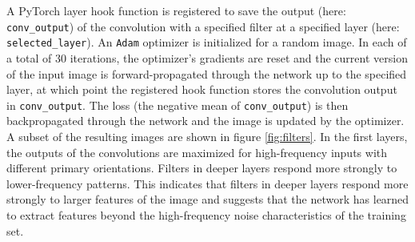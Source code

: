 \documentclass[a4paper]{article}
\begin{document}
A PyTorch layer hook function is registered to save the output (here: \texttt{conv\_output}) of the convolution with a specified filter at a specified layer (here: \texttt{selected\_layer}). An \texttt{Adam} optimizer \cite{Kingma2014} is initialized for a random image. In each of a total of 30 iterations, the optimizer's gradients are reset and the current version of the input image is forward-propagated through the network up to the specified layer, at which point the registered hook function stores the convolution output in \texttt{conv\_output}. The loss (the negative mean of \texttt{conv\_output}) is then backpropagated through the network and the image is updated by the optimizer.\\
A subset of the resulting images are shown in figure \ref{fig:filters}. In the first layers, the outputs of the convolutions are maximized for high-frequency inputs with different primary orientations. Filters in deeper layers respond more strongly to lower-frequency patterns. This indicates that filters in deeper layers respond more strongly to larger features of the image and suggests that the network has learned to extract features beyond the high-frequency noise characteristics of the training set.
\end{document}
